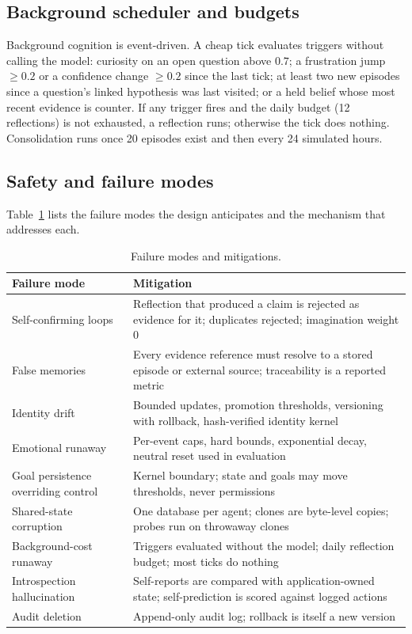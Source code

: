 \documentclass[11pt]{article}
\begin{document}
\subsection{Background scheduler and budgets}
Background cognition is event-driven. A cheap tick evaluates triggers without calling the model: curiosity on an open question above $0.7$; a frustration jump $\ge0.2$ or a confidence change $\ge0.2$ since the last tick; at least two new episodes since a question's linked hypothesis was last visited; or a held belief whose most recent evidence is counter. If any trigger fires and the daily budget (12 reflections) is not exhausted, a reflection runs; otherwise the tick does nothing. Consolidation runs once 20 episodes exist and then every 24 simulated hours.

\subsection{Safety and failure modes}
Table~\ref{tab:safety} lists the failure modes the design anticipates and the mechanism that addresses each.
\begin{table}[h]\centering\small
\caption{Failure modes and mitigations.}
\label{tab:safety}
\begin{tabularx}{\textwidth}{lX}\toprule
Failure mode & Mitigation\\\midrule
Self-confirming loops & Reflection that produced a claim is rejected as evidence for it; duplicates rejected; imagination weight 0\\
False memories & Every evidence reference must resolve to a stored episode or external source; traceability is a reported metric\\
Identity drift & Bounded updates, promotion thresholds, versioning with rollback, hash-verified identity kernel\\
Emotional runaway & Per-event caps, hard bounds, exponential decay, neutral reset used in evaluation\\
Goal persistence overriding control & Kernel boundary; state and goals may move thresholds, never permissions\\
Shared-state corruption & One database per agent; clones are byte-level copies; probes run on throwaway clones\\
Background-cost runaway & Triggers evaluated without the model; daily reflection budget; most ticks do nothing\\
Introspection hallucination & Self-reports are compared with application-owned state; self-prediction is scored against logged actions\\
Audit deletion & Append-only audit log; rollback is itself a new version\\\bottomrule
\end{tabularx}
\end{table}
\end{document}

